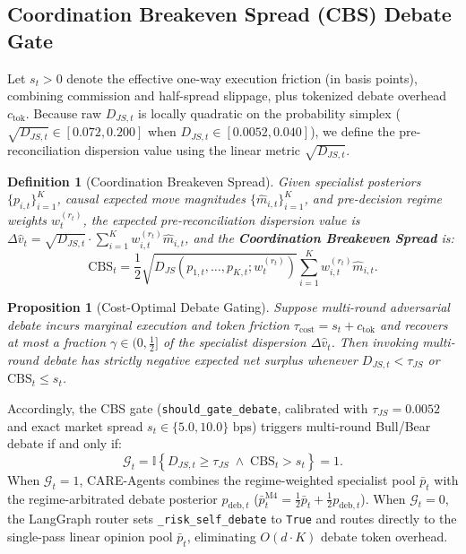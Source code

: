 \documentclass[10pt,a4paper,twocolumn]{article}
\newtheorem{proposition}{Proposition}
\newtheorem{definition}{Definition}
\begin{document}
\subsection{Coordination Breakeven Spread (CBS) Debate Gate}

Let $s_t > 0$ denote the effective one-way execution friction (in basis points), combining commission and half-spread slippage, plus tokenized debate overhead $c_{\text{tok}}$. Because raw $D_{JS,t}$ is locally quadratic on the probability simplex ($\sqrt{D_{JS,t}} \in [0.072, 0.200]$ when $D_{JS,t} \in [0.0052, 0.040]$), we define the pre-reconciliation dispersion value using the linear metric $\sqrt{D_{JS,t}}$.

\begin{definition}[Coordination Breakeven Spread]
Given specialist posteriors $\{p_{i,t}\}_{i=1}^K$, causal expected move magnitudes $\{\hat{m}_{i,t}\}_{i=1}^K$, and pre-decision regime weights $w_t^{(r_t)}$, the expected pre-reconciliation dispersion value is $\Delta \hat{v}_t = \sqrt{D_{JS,t}} \cdot \sum_{i=1}^K w_{i,t}^{(r_t)} \hat{m}_{i,t}$, and the \textbf{Coordination Breakeven Spread} is:
\begin{equation}
  \text{CBS}_t = \frac{1}{2} \sqrt{D_{JS}\!\left(p_{1,t}, \dots, p_{K,t}; w_t^{(r_t)}\right)} \sum_{i=1}^K w_{i,t}^{(r_t)} \hat{m}_{i,t}.
  \label{eq:cbs}
\end{equation}
\end{definition}

\begin{proposition}[Cost-Optimal Debate Gating]
Suppose multi-round adversarial debate incurs marginal execution and token friction $\tau_{\text{cost}} = s_t + c_{\text{tok}}$ and recovers at most a fraction $\gamma \in (0, \frac{1}{2}]$ of the specialist dispersion $\Delta \hat{v}_t$. Then invoking multi-round debate has strictly negative expected net surplus whenever $D_{JS,t} < \tau_{JS}$ or $\text{CBS}_t \le s_t$.
\end{proposition}

Accordingly, the CBS gate (\texttt{should\_gate\_debate}, calibrated with $\tau_{JS} = 0.0052$ and exact market spread $s_t \in \{5.0, 10.0\}\text{ bps}$) triggers multi-round Bull/Bear debate if and only if:
\begin{equation}
  \mathcal{G}_t = \mathbb{I}\!\left\{ D_{JS,t} \ge \tau_{JS} \;\wedge\; \text{CBS}_t > s_t \right\} = 1.
  \label{eq:gate}
\end{equation}
When $\mathcal{G}_t = 1$, CARE-Agents combines the regime-weighted specialist pool $\bar{p}_t$ with the regime-arbitrated debate posterior $p_{\text{deb},t}$ ($\bar{p}_t^{\text{M4}} = \frac{1}{2}\bar{p}_t + \frac{1}{2}p_{\text{deb},t}$). When $\mathcal{G}_t = 0$, the LangGraph router sets \texttt{\_risk\_self\_debate} to \texttt{True} and routes directly to the single-pass linear opinion pool $\bar{p}_t$, eliminating $O(d \cdot K)$ debate token overhead.
\end{document}
